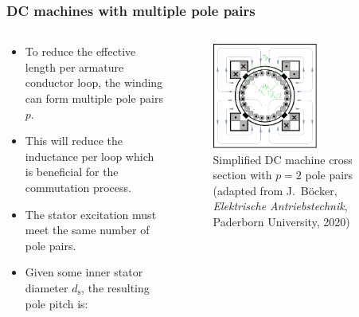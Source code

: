 \begin{frame}
	\frametitle{DC machines with multiple pole pairs}
    \begin{columns}
		\begin{column}{0.42\textwidth}
            \begin{itemize}
				\item To reduce the effective length per armature conductor loop, the winding can form multiple pole pairs $p$.
				\item<2-> This will reduce the inductance per loop which is beneficial for the commutation process.
				\item<3-> The stator excitation must meet the same number of pole pairs.
				\item<4-> Given some inner stator diameter $d_\mathrm{s}$, the resulting pole pitch is:
			\end{itemize}
		\end{column}
        \hfill
		\begin{column}{0.55\textwidth}
			\begin{figure}
				\centering
				\includegraphics[width=0.64\textwidth]{fig/lec03/DC_machine_cross_section_two_pole_pairs.pdf}
				\caption{Simplified DC machine cross section with $p=2$ pole pairs (adapted from J.~B\"ocker, \textit{Elektrische Antriebstechnik}, Paderborn University, 2020)}
				\label{fig:DC_machine_cross_section_two_pole_pairs}
			\end{figure}
		\end{column}
		\end{columns}
\end{frame}

